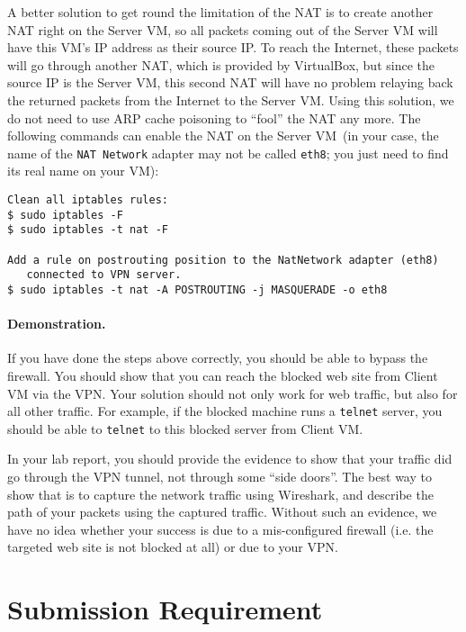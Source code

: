 A better solution to get round the limitation of the NAT is to create another NAT
right on the Server VM, so all packets coming out of the Server VM will have this VM's IP address as their source IP.
To reach the Internet, these packets will go through another NAT, which is provided by
VirtualBox, but since the source IP is the Server VM, this second NAT will have no problem relaying back
the returned packets from the Internet to the Server VM. Using this solution, we do not need to use ARP
cache poisoning to ``fool'' the NAT any more. The following commands can enable the NAT on
the Server VM~(in your case, the name of the \texttt{NAT Network} adapter may not be called 
\texttt{eth8}; you just need to find its real name on your VM):

    
\begin{lstlisting}
Clean all iptables rules:
$ sudo iptables -F
$ sudo iptables -t nat -F 

Add a rule on postrouting position to the NatNetwork adapter (eth8)
   connected to VPN server.
$ sudo iptables -t nat -A POSTROUTING -j MASQUERADE -o eth8
\end{lstlisting}
    


\paragraph{Demonstration.}
If you have done the steps above correctly, you should be able to bypass
the firewall. You should show that you can reach the blocked web site from Client VM
via the VPN.  Your solution should
not only work for web traffic, but also for all other traffic. For example, if the blocked
machine runs a \texttt{telnet} server, you should be able to \texttt{telnet} to this blocked server from
Client VM. 

In your lab report, you should provide the evidence to show that your traffic did go through
the VPN tunnel, not through some ``side doors''. The best way to show that is to capture the
network traffic using Wireshark, and describe the path of your packets using the captured
traffic. Without such an evidence, we have no idea whether your success is due to a
mis-configured firewall (i.e. the targeted web site is not blocked at all) or due to your VPN.



\section{Submission Requirement}


\seedsubmission





